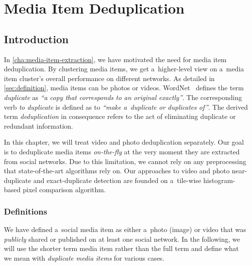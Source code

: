 \chapter{Media Item Deduplication}
\label{cha:media-item-deduplication}

\ifpdf
    \graphicspath{{7_media_item_deduplication/figures/PNG/}{7_media_item_deduplication/figures/PDF/}{7_media_item_deduplication/figures/}}
\else
    \graphicspath{{7_media_item_deduplication/figures/EPS/}{7_media_item_deduplication/figures/}}
\fi

\section{Introduction}

In \autoref{cha:media-item-extraction},
we have motivated the need for media item deduplication.
By clustering media items, we get a~higher-level view on
a~media item cluster's overall performance on different networks.
As detailed in \autoref{sec:definition}, media items can be
photos or videos.
WordNet~\cite{fellbaum1998wordnet,miller1995wordnet} defines
the term \emph{duplicate} as
\textit{``a copy that corresponds to an original exactly''}.
The corresponding verb \emph{to duplicate} is defined as to
\textit{``make a~duplicate or duplicates of''}.
The derived term \emph{deduplication} in consequence refers to
the act of eliminating duplicate or redundant information.

In this chapter, we will treat video
and photo deduplication separately.
Our goal is to deduplicate media items \emph{on-the-fly}
at the very moment they are extracted from social networks.
Due to this limitation, we cannot rely on any preprocessing
that state-of-the-art algorithms rely on.
Our approaches to video and photo near-duplicate
and exact-duplicate detection are founded
on a~tile-wise histogram-based pixel comparison algorithm.

\subsection{Definitions}

We have defined a~social media item as either a~photo (image) or video
that was \emph{publicly} shared or published
on at least one social network.
In the following, we will use the shorter term media item
rather than the full term and define
what we mean with \emph{duplicate media items} for various cases.


